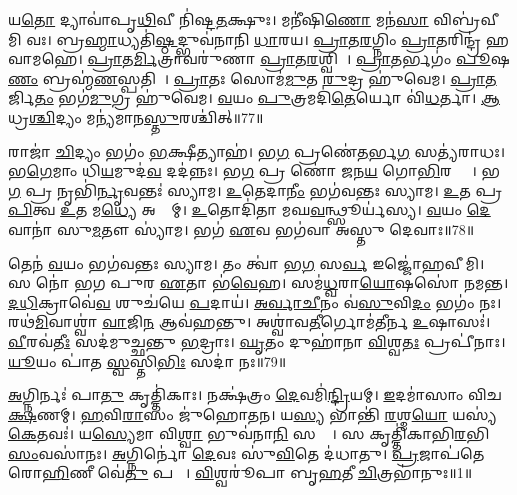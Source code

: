 𑌯\ul{𑌤𑍋} 𑌦𑍍𑌯𑌾𑌵𑌾॑𑌪𑍃\ul{𑌥𑌿}𑌵𑍀 𑌨𑌿॑𑌷𑍍𑌟\ul{𑌤}𑌕𑍍𑌷𑍁𑌃।
𑌮𑌨𑍀॑𑌷𑌿\ul{𑌣𑍋} 𑌮𑌨॑\ul{𑌸𑌾} 𑌵𑌿𑌬𑍍𑌰॑𑌵𑍀𑌮𑌿 𑌵𑌃।
𑌬𑍍𑌰\ul{𑌹𑍍𑌮𑌾}𑌧𑍍𑌯𑌤𑌿॑\ul{𑌷𑍍𑌠}𑌦𑍍𑌭𑍁𑌵॑𑌨𑌾𑌨𑌿 \ul{𑌧𑌾}𑌰𑌯\sn{}।
\ul{𑌪𑍍𑌰𑌾}𑌤\ul{𑌰}𑌗𑍍𑌨𑌿𑌂 \ul{𑌪𑍍𑌰𑌾}𑌤𑌰𑌿𑌨𑍍𑌦𑍍𑌰॑ 𑌹𑌵𑌾𑌮𑌹𑍇।
\ul{𑌪𑍍𑌰𑌾}𑌤\ul{𑌰𑍍𑌮𑌿}𑌤𑍍𑌰𑌾𑌵𑌰𑍁॑𑌣𑌾 \ul{𑌪𑍍𑌰𑌾}𑌤\ul{𑌰}𑌶𑍍𑌵𑌿𑌨𑌾᳚।
\ul{𑌪𑍍𑌰𑌾}𑌤𑌰𑍍𑌭𑌗𑌂॑ \ul{𑌪𑍂}𑌷\ul{𑌣𑌂} 𑌬𑍍𑌰𑌹𑍍𑌮॑\ul{𑌣}𑌸𑍍𑌪𑌤𑌿𑌮𑍍᳚।
\ul{𑌪𑍍𑌰𑌾}𑌤𑌃 𑌸𑍋𑌮॑\ul{𑌮𑍁}𑌤 \ul{𑌰𑍁}𑌦𑍍𑌰 𑌹𑍁॑𑌵𑍇𑌮।
\ul{𑌪𑍍𑌰𑌾}\ul{𑌤}𑌰𑍍𑌜𑌿\ul{𑌤𑌂} 𑌭𑌗॑\ul{𑌮𑍁}𑌗𑍍𑌰 𑌹𑍁॑𑌵𑍇𑌮।
\ul{𑌵}𑌯𑌂 \ul{𑌪𑍁}𑌤𑍍𑌰𑌮𑌦𑌿॑\ul{𑌤𑍇}𑌰𑍍𑌯𑍋 𑌵𑌿॑\ul{𑌧}𑌰𑍍𑌤𑌾।
\ul{𑌆}𑌧𑍍𑌰\ul{𑌶𑍍𑌚𑌿}𑌦𑍍𑌯𑌂 𑌮𑌨𑍍𑌯॑𑌮𑌾𑌨\ul{𑌸𑍍𑌤𑍁}𑌰𑌶𑍍𑌚𑌿॑𑌤𑍍॥77॥

𑌰𑌾𑌜𑌾॑ \ul{𑌚𑌿}𑌦𑍍𑌯𑌂 𑌭𑌗𑌂॑ \ul{𑌭}𑌕𑍍𑌷𑍀𑌤𑍍𑌯𑌾𑌹॑।
𑌭\ul{𑌗} 𑌪𑍍𑌰𑌣𑍇॑\ul{𑌤}𑌰𑍍𑌭\ul{𑌗} 𑌸𑌤𑍍𑌯॑𑌰𑌾𑌧𑌃।
𑌭\ul{𑌗𑍇}𑌮𑌾𑌂 𑌧𑌿\ul{𑌯}𑌮𑍁𑌦॑\ul{𑌵} 𑌦𑌦॑𑌨𑍍𑌨𑌃।
𑌭\ul{𑌗} 𑌪𑍍𑌰 𑌣𑍋॑ 𑌜𑌨\ul{𑌯} 𑌗𑍋\ul{𑌭𑌿}𑌰𑌶𑍍𑌵𑍈𑌃᳚।
𑌭\ul{𑌗} 𑌪𑍍𑌰 𑌨𑍃𑌭𑌿॑\ul{𑌰𑍍𑌨𑍃}𑌵𑌨𑍍𑌤𑌃॑ 𑌸𑍍𑌯𑌾𑌮।
\ul{𑌉}𑌤𑍇𑌦𑌾\ul{𑌨𑍀𑌂} 𑌭𑌗॑𑌵𑌨𑍍𑌤𑌃 𑌸𑍍𑌯𑌾𑌮।
\ul{𑌉}𑌤 𑌪𑍍𑌰\ul{𑌪𑌿}𑌤𑍍𑌵 \ul{𑌉}𑌤 𑌮\ul{𑌧𑍍𑌯𑍇} 𑌅𑌹𑍍𑌨𑌾᳚𑌮𑍍।
\ul{𑌉}𑌤𑍋𑌦𑌿॑𑌤𑌾 𑌮𑌘\ul{𑌵}𑌨𑍍𑌥𑍍𑌸𑍂𑌰𑍍𑌯॑𑌸𑍍𑌯।
\ul{𑌵}𑌯𑌂 \ul{𑌦𑍇}𑌵𑌾𑌨𑌾॑ 𑌸𑍁\ul{𑌮}𑌤𑍗 𑌸𑍍𑌯𑌾॑𑌮।
𑌭𑌗॑ \ul{𑌏}𑌵 𑌭𑌗॑𑌵𑌾 𑌅𑌸𑍍𑌤𑍁 𑌦𑍇𑌵𑌾𑌃॥78॥

𑌤𑍇𑌨॑ \ul{𑌵}𑌯𑌂 𑌭𑌗॑𑌵𑌨𑍍𑌤𑌃 𑌸𑍍𑌯𑌾𑌮।
𑌤𑌂 𑌤𑍍𑌵𑌾॑ 𑌭\ul{𑌗} 𑌸\ul{𑌰𑍍𑌵} 𑌇𑌜𑍍𑌜𑍋॑𑌹𑌵𑍀𑌮𑌿।
𑌸 𑌨𑍋॑ 𑌭𑌗 𑌪𑍁𑌰 \ul{𑌏}𑌤𑌾 𑌭॑\ul{𑌵𑍇}𑌹।
𑌸𑌮॑\ul{𑌧𑍍𑌵}𑌰𑌾\ul{𑌯𑍋}𑌷𑌸𑍋॑ 𑌨𑌮𑌨𑍍𑌤।
\ul{𑌦}\ul{𑌧𑌿}𑌕𑍍𑌰𑌾𑌵𑍇॑\ul{𑌵} 𑌶𑍁𑌚॑𑌯𑍇 \ul{𑌪}𑌦𑌾𑌯॑।
\ul{𑌅}\ul{𑌰𑍍𑌵𑌾}\ul{𑌚𑍀}𑌨𑌂 𑌵॑\ul{𑌸𑍁}𑌵𑌿\ul{𑌦𑌂} 𑌭𑌗𑌂॑ 𑌨𑌃।
𑌰𑌥॑\ul{𑌮𑌿}𑌵𑌾𑌶𑍍𑌵𑌾॑ \ul{𑌵𑌾}𑌜𑌿\ul{𑌨} 𑌆𑌵॑𑌹𑌨𑍍𑌤𑍁।
𑌅𑌶𑍍𑌵𑌾॑𑌵\ul{𑌤𑍀}𑌰𑍍𑌗𑍋𑌮॑𑌤𑍀𑌰𑍍𑌨 \ul{𑌉}𑌷𑌾𑌸𑌃॑।
\ul{𑌵𑍀}𑌰𑌵॑\ul{𑌤𑍀𑌃} 𑌸𑌦॑𑌮𑍁𑌚𑍍𑌛𑌨𑍍𑌤𑍁 \ul{𑌭}𑌦𑍍𑌰𑌾𑌃।
\ul{𑌘𑍃}𑌤𑌂 𑌦𑍁𑌹𑌾॑𑌨𑌾 \ul{𑌵𑌿}𑌶𑍍𑌵\ul{𑌤𑌃} 𑌪𑍍𑌰𑌪𑍀॑𑌨𑌾𑌃।
\ul{𑌯𑍂}𑌯𑌂 𑌪𑌾॑𑌤 \ul{𑌸𑍍𑌵}𑌸𑍍𑌤𑌿\ul{𑌭𑌿𑌃} 𑌸𑌦𑌾॑ 𑌨𑌃॥79॥\anuvakamend[\ul{𑌵𑌿}\ul{𑌚}\ul{𑌕𑍍𑌷}𑌣𑌾 𑌵𑌿॑𑌚\ul{𑌰𑍍𑌤𑍁}𑌰\dng{ꣳ} 𑌶\ul{𑌰𑍍𑌮}𑌨𑍍𑌨𑌧𑌿॑ \ul{𑌵𑌿}𑌸𑌰𑍍𑌜॑𑌨𑌾\ul{𑌯} 𑌬𑍍𑌰\ul{𑌹𑍍𑌮} 𑌵\ul{𑌨𑌂} 𑌬𑍍𑌰\ul{𑌹𑍍𑌮} 𑌸 \ul{𑌵𑍃}𑌕𑍍𑌷 𑌆॑𑌸𑍀\ul{𑌤𑍍𑌤𑍁}𑌰𑌶𑍍𑌚𑌿॑𑌦𑍍𑌦𑍇\ul{𑌵𑌾𑌃} 𑌪𑍍𑌰𑌪𑍀॑\ul{𑌨𑌾} 𑌏𑌕𑌂॑ 𑌚]
\clearpage

\setcounter{anuvakam}{0}

\ul{𑌅}𑌗𑍍𑌨𑌿𑌰𑍍𑌨𑌃॑ 𑌪𑌾\ul{𑌤𑍁} 𑌕𑍃𑌤𑍍𑌤𑌿॑𑌕𑌾𑌃।
𑌨𑌕𑍍𑌷॑𑌤𑍍𑌰𑌂 \ul{𑌦𑍇}𑌵𑌮𑌿॑\ul{𑌨𑍍𑌦𑍍𑌰𑌿}𑌯𑌮𑍍।
\ul{𑌇}𑌦𑌮𑌾॑𑌸𑌾𑌂 𑌵𑌿𑌚\ul{𑌕𑍍𑌷}𑌣𑌮𑍍।
\ul{𑌹}𑌵𑌿\ul{𑌰𑌾}𑌸𑌂 𑌜𑍁॑𑌹𑍋𑌤𑌨।
𑌯\ul{𑌸𑍍𑌯} 𑌭𑌾𑌨𑍍𑌤𑌿॑ \ul{𑌰}𑌶𑍍𑌮\ul{𑌯𑍋} 𑌯𑌸𑍍𑌯॑ \ul{𑌕𑍇}𑌤𑌵𑌃॑।
𑌯\ul{𑌸𑍍𑌯𑍇}𑌮𑌾 𑌵𑌿\ul{𑌶𑍍𑌵𑌾} 𑌭𑍁𑌵॑𑌨𑌾\ul{𑌨𑌿} 𑌸𑌰𑍍𑌵𑌾᳚।
𑌸 𑌕𑍃𑌤𑍍𑌤𑌿॑𑌕𑌾𑌭𑌿\-\ul{𑌰}𑌭𑌿\ul{𑌸𑌂}𑌵𑌸𑌾॑𑌨𑌃।
\ul{𑌅}𑌗𑍍𑌨𑌿𑌰𑍍𑌨𑍋॑ \ul{𑌦𑍇}𑌵𑌃 𑌸𑍁॑\ul{𑌵𑌿}𑌤𑍇 𑌦॑𑌧𑌾𑌤𑍁।
\ul{𑌪𑍍𑌰}𑌜𑌾𑌪॑𑌤𑍇 𑌰𑍋\ul{𑌹𑌿}𑌣𑍀 𑌵𑍇॑\ul{𑌤𑍁} 𑌪𑌤𑍍𑌨𑍀᳚।
\ul{𑌵𑌿}𑌶𑍍𑌵𑌰𑍂॑𑌪𑌾 𑌬𑍃\ul{𑌹}𑌤𑍀 \ul{𑌚𑌿}𑌤𑍍𑌰𑌭𑌾॑𑌨𑍁𑌃॥1॥

